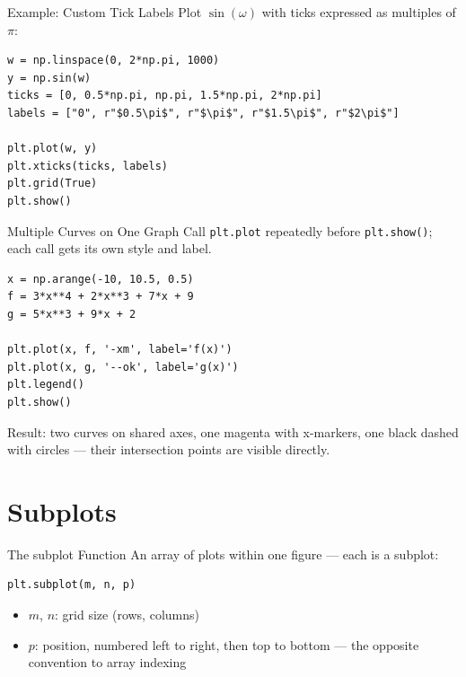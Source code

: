 \documentclass[9pt,aspectratio=169,xcolor=table]{beamer}
\begin{document}
\begin{frame}[fragile]{Example: Custom Tick Labels}
    \leavevmode
    Plot $\sin(\omega)$ with ticks expressed as multiples of $\pi$:

\begin{lstlisting}
w = np.linspace(0, 2*np.pi, 1000)
y = np.sin(w)
ticks = [0, 0.5*np.pi, np.pi, 1.5*np.pi, 2*np.pi]
labels = ["0", r"$0.5\pi$", r"$\pi$", r"$1.5\pi$", r"$2\pi$"]

plt.plot(w, y)
plt.xticks(ticks, labels)
plt.grid(True)
plt.show()
\end{lstlisting}
\end{frame}

\begin{frame}[fragile]{Multiple Curves on One Graph}
    \leavevmode
    Call \texttt{plt.plot} repeatedly before \texttt{plt.show()}; each
    call gets its own style and label.

\begin{lstlisting}
x = np.arange(-10, 10.5, 0.5)
f = 3*x**4 + 2*x**3 + 7*x + 9
g = 5*x**3 + 9*x + 2

plt.plot(x, f, '-xm', label='f(x)')
plt.plot(x, g, '--ok', label='g(x)')
plt.legend()
plt.show()
\end{lstlisting}

    \vspace{1mm}
    {\small Result: two curves on shared axes, one magenta with
    x-markers, one black dashed with circles --- their intersection
    points are visible directly.}
\end{frame}

\section{Subplots}

\begin{frame}[fragile]{The subplot Function}
    \leavevmode
    An array of plots within one figure --- each is a \alert{subplot}:

\begin{lstlisting}
plt.subplot(m, n, p)
\end{lstlisting}

    \vspace{2mm}
    \begin{itemize}
        \item $m$, $n$: grid size (rows, columns)
        \item $p$: position, numbered \alert{left to right, then top to
              bottom} --- the opposite convention to array indexing
    \end{itemize}
\end{frame}
\end{document}
